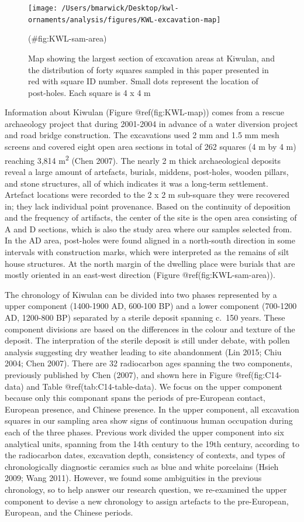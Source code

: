 \documentclass[]{article}
\begin{document}
\begin{figure}
\texttt{[image: /Users/bmarwick/Desktop/kwl-ornaments/analysis/figures/KWL-excavation-map]} \caption{Map showing the largest section of excavation areas at Kiwulan, and the distribution of forty squares sampled in this paper presented in red with square ID number. Small dots represent the location of post-holes. Each square is 4 x 4 m}(\#fig:KWL-sam-area)
\end{figure}

Information about Kiwulan (Figure @ref(fig:KWL-map)) comes from a rescue
archaeology project that during 2001-2004 in advance of a water
diversion project and road bridge construction. The excavations used 2
mm and 1.5 mm mesh screens and covered eight open area sections in total
of 262 squares (4 m by 4 m) reaching 3,814 m\textsuperscript{2} (Chen
2007). The nearly 2 m thick archaeological deposits reveal a large
amount of artefacts, burials, middens, post-holes, wooden pillars, and
stone structures, all of which indicates it was a long-term settlement.
Artefact locations were recorded to the 2 x 2 m sub-square they were
recovered in; they lack individual point provenance. Based on the
continuity of deposition and the frequency of artifacts, the center of
the site is the open area consisting of A and D sections, which is also
the study area where our samples selected from. In the AD area,
post-holes were found aligned in a north-south direction in some
intervals with construction marks, which were interpreted as the remains
of silt house structures. At the north margin of the dwelling place were
burials that are mostly oriented in an east-west direction (Figure
@ref(fig:KWL-sam-area)).

The chronology of Kiwulan can be divided into two phases represented by
a upper component (1400-1900 AD, 600-100 BP) and a lower component
(700-1200 AD, 1200-800 BP) separated by a sterile deposit spanning
c.~150 years. These component divisions are based on the differences in
the colour and texture of the deposit. The interpration of the sterile
deposit is still under debate, with pollen analysis suggesting dry
weather leading to site abandonment (Lin 2015; Chiu 2004; Chen 2007).
There are 32 radiocarbon ages spanning the two components, previously
published by Chen (2007), and shown here in Figure @ref(fig:C14-data)
and Table @ref(tab:C14-table-data). We focus on the upper component
because only this componant spans the periods of pre-European contact,
European presence, and Chinese presence. In the upper component, all
excavation squares in our sampling area show signs of continuous human
occupation during each of the three phases. Previous work divided the
upper component into six analytical units, spanning from the 14th
century to the 19th century, according to the radiocarbon dates,
excavation depth, consistency of contexts, and types of chronologically
diagnostic ceramics such as blue and white porcelains (Hsieh 2009; Wang
2011). However, we found some ambiguities in the previous chronology, so
to help answer our research question, we re-examined the upper component
to devise a new chronology to assign artefacts to the pre-European,
European, and the Chinese periods.
\end{document}
